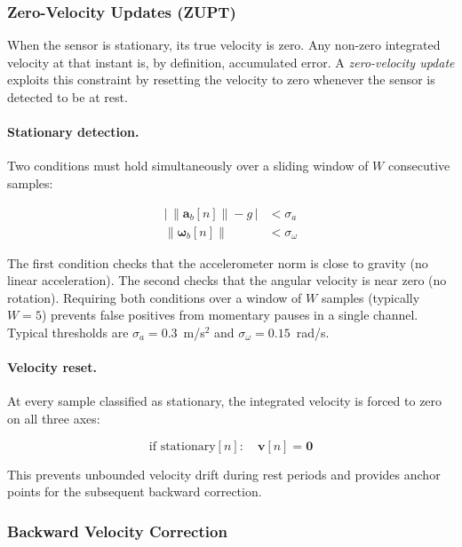 \subsubsection{Zero-Velocity Updates (ZUPT)}
\label{sec:proj:zupt}

When the sensor is stationary, its true velocity is zero. Any non-zero
integrated velocity at that instant is, by definition, accumulated error.
A \emph{zero-velocity update} exploits this constraint by resetting the
velocity to zero whenever the sensor is detected to be at rest.

\paragraph{Stationary detection.}
Two conditions must hold simultaneously over a sliding window of $W$
consecutive samples:

\begin{align}
  \bigl|\,\lVert \mathbf{a}_b[n] \rVert - g\,\bigr|
    &< \sigma_a
  \label{eq:zupt_accel} \\[4pt]
  \lVert \boldsymbol{\omega}_b[n] \rVert
    &< \sigma_\omega
  \label{eq:zupt_gyro}
\end{align}

\noindent The first condition checks that the accelerometer norm is close to
gravity (no linear acceleration). The second checks that the angular velocity
is near zero (no rotation). Requiring both conditions over a window of $W$
samples (typically $W = 5$) prevents false positives from momentary pauses in
a single channel. Typical thresholds are $\sigma_a = 0.3$~m/s$^2$ and
$\sigma_\omega = 0.15$~rad/s.

\paragraph{Velocity reset.}
At every sample classified as stationary, the integrated velocity is forced to
zero on all three axes:

\begin{equation}
  \text{if stationary}[n]: \quad \mathbf{v}[n] = \mathbf{0}
  \label{eq:zupt_reset}
\end{equation}

\noindent This prevents unbounded velocity drift during rest periods and
provides anchor points for the subsequent backward correction.

\subsubsection{Backward Velocity Correction}
\label{sec:proj:backward}


